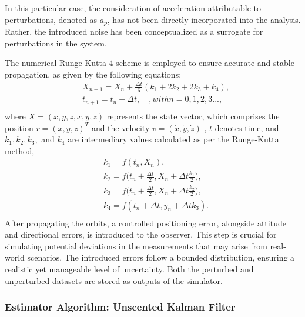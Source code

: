 In this particular case, the consideration of acceleration attributable to perturbations, denoted as $a_p$, has not been directly incorporated into the analysis. Rather, the introduced noise has been conceptualized as a surrogate for perturbations in the system.

The numerical Runge-Kutta 4 scheme is employed to ensure accurate and stable propagation, as given by the following equations:
\begin{equation}
    \begin{aligned}
        &X_{n+1} =X_n+\frac {\Delta t}{6}\left(k_1+2k_2+2k_3+k_4\right),  \\
        &t_{n+1} =t_n+\Delta t , \quad, with n=0, 1, 2, 3...,\\
    \end{aligned}
\end{equation}
where $X = (x, y, z,\dot{x}, \dot{y},\dot{z})$ represents the state vector, which comprises the position $r=(x, y, z)^T$ and the velocity $v=(\dot{x}, \dot{y},\dot{z})$ , $t$ denotes time, and $k_1, k_2, k_3,$ and $k_4$ are intermediary values calculated as per the Runge-Kutta method,\\
\begin{equation}
    \begin{aligned}
        &k_{1} =f(t_{n},X_{n}),  \\
        &k_{2} =f\biggl(t_{n}+\frac{\Delta t}{2},X_{n}+\Delta t\frac{k_{1}}{2}\biggr),  \\
        &k_{3} =f\biggl(t_{n}+\frac{\Delta t}{2},X_{n}+\Delta t\frac{k_{2}}{2}\biggr),  \\
        &k _4=f(t_{n}+\Delta t,y_{n}+\Delta tk_{3}). \\
        \end{aligned}
\end{equation}
After propagating the orbits, a controlled positioning error, alongside attitude and directional errors, is introduced to the observer. This step is crucial for simulating potential deviations in the measurements that may arise from real-world scenarios. The introduced errors follow a bounded distribution, ensuring a realistic yet manageable level of uncertainty.
Both the perturbed and unperturbed datasets are stored as outputs of the simulator. 

\subsubsection{Estimator Algorithm: Unscented Kalman Filter}


